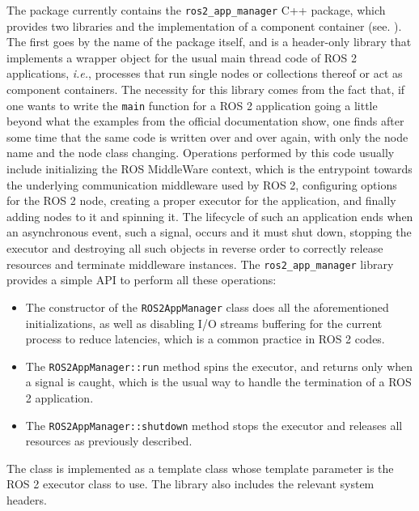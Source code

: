 The package currently contains the \texttt{ros2\_app\_manager} C++ package, which provides two libraries and the implementation of a component container (see. ). The first goes by the name of the package itself, and is a header-only library that implements a wrapper object for the usual main thread code of ROS 2 applications, \emph{i.e.}, processes that run single nodes or collections thereof or act as component containers. The necessity for this library comes from the fact that, if one wants to write the \texttt{main} function for a ROS 2 application going a little beyond what the examples from the official documentation show, one finds after some time that the same code is written over and over again, with only the node name and the node class changing. Operations performed by this code usually include initializing the ROS MiddleWare context, which is the entrypoint towards the underlying communication middleware used by ROS 2, configuring options for the ROS 2 node, creating a proper executor for the application, and finally adding nodes to it and spinning it. The lifecycle of such an application ends when an asynchronous event, such a signal, occurs and it must shut down, stopping the executor and destroying all such objects in reverse order to correctly release resources and terminate middleware instances. The \texttt{ros2\_app\_manager} library provides a simple API to perform all these operations:
\begin{itemize}
  \item The constructor of the \texttt{ROS2AppManager} class does all the aforementioned initializations, as well as disabling I/O streams buffering for the current process to reduce latencies, which is a common practice in ROS 2 codes.
  \item The \texttt{ROS2AppManager::run} method spins the executor, and returns only when a signal is caught, which is the usual way to handle the termination of a ROS 2 application.
  \item The \texttt{ROS2AppManager::shutdown} method stops the executor and releases all resources as previously described.
\end{itemize}
The class is implemented as a template class whose template parameter is the ROS 2 executor class to use. The library also includes the relevant system headers.

